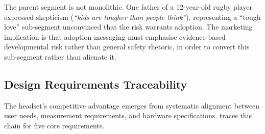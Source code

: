 The parent segment is not monolithic. One father of a 12-year-old rugby player expressed skepticism (\textit{``kids are tougher than people think''}), representing a ``tough love'' sub-segment unconvinced that the risk warrants adoption. The marketing implication is that adoption messaging must emphasise evidence-based developmental risk rather than general safety rhetoric, in order to convert this sub-segment rather than alienate it.


\subsection{Design Requirements Traceability}
\label{sec:ent-traceability}

The headset's competitive advantage emerges from systematic alignment between user needs, measurement requirements, and hardware specifications.  traces this chain for five core requirements.

